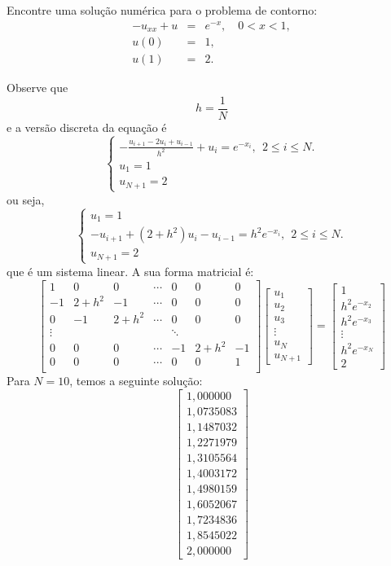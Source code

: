\begin{ex}Encontre uma solução numérica para o problema de contorno:
  \begin{eqnarray}
    -u_{xx} + u  &=& e^{-x},\quad 0<x<1,\\
    u(0) &=& 1,\\
    u(1) &=& 2.
  \end{eqnarray}
\end{ex}
\begin{sol}
Observe que
$$
h=\frac{1}{N}
$$
e a versão discreta da equação é
$$\left\{\begin{array}{l}-\frac{u_{i+1}-2u_i+u_{i-1}}{h^2}+u_i=e^{-x_i},~~ 2\leq i\leq N.\\
u_1=1\\
u_{N+1}=2\end{array}
\right.
$$
ou seja,
$$\left\{\begin{array}{l}u_1=1\\-u_{i+1}+(2+h^2)u_i-u_{i-1}=h^2e^{-x_i},~~ 2\leq i\leq N.\\
u_{N+1}=2\end{array}
\right.
$$
que é um sistema linear. A sua forma matricial é:
$$
\left[\begin{array}{ccccccc}
1&0&0&\cdots&0&0&0\\
-1&2+h^2&-1&\cdots&0&0&0\\
0&-1&2+h^2&\cdots&0&0&0\\
\vdots&&&&\ddots&&\\
0&0&0&\cdots&-1&2+h^2&-1\\
0&0&0&\cdots&0&0&1\\
\end{array}\right]
\left[\begin{array}{c}u_1\\u_2\\u_3\\ \vdots\\ u_{N}\\u_{N+1}\end{array}\right]=
\left[\begin{array}{c}1\\h^2e^{-x_2}\\h^2e^{-x_3}\\ \vdots\\ h^2e^{-x_N}\\2\end{array}\right]
$$
Para $N=10$, temos a seguinte solução:
$$
\left[\begin{array}{c} 1,000000\\  1,0735083  \\1,1487032 \\ 1,2271979\\  1,3105564\\  1,4003172\\  1,4980159\\  1,6052067\\  1,7234836\\  1,8545022\\2,000000\end{array}\right]
$$  
\end{sol}

